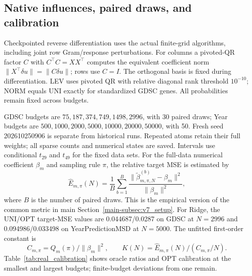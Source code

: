 \documentclass[11pt,a4paper,leqno]{article}
\numberwithin{equation}{section}
\numberwithin{figure}{section}
\numberwithin{table}{section}
\theoremstyle{plain}
\theoremstyle{definition}
\theoremstyle{remark}
\begin{document}
\subsection{Native influences, paired draws, and calibration}
Checkpointed reverse differentiation uses the actual finite-grid algorithms,
including joint row Gram/response perturbations. For columns a pivoted-QR
factor $C$ with $C^\top C=XX^\top$ computes the equivalent coefficient
norm $\|X^\top\delta u\|=\|C\delta u\|$; rows use $C=I$.
The orthogonal basis is fixed during differentiation. LEV uses pivoted
QR with relative diagonal rank threshold $10^{-10}$; NORM equals UNI
exactly for standardized GDSC genes. All probabilities remain fixed across budgets.

GDSC budgets are $75,187,374,749,1498,2996$, with 30 paired draws;
Year budgets are $500,1000,2000,5000,10000,20000,50000$, with 50.
Fresh seed 202610250906 is separate from historical runs. Repeated atoms
retain their full weights; all sparse counts and numerical states are saved.
Intervals use conditional $t_{29}$ and $t_{49}$ for the fixed data sets.
For the full-data numerical coefficient $\beta_m$ and sampling rule $\pi$,
the relative target MSE is estimated by
\begin{equation}\label{eq:real_relative_mse}
 \widehat E_{m,\pi}(N)=\frac1B\sum_{b=1}^B
 \frac{\|\widetilde\beta_{m,\pi,N}^{(b)}-\beta_m\|^2}{\|\beta_m\|^2},
\end{equation}
where $B$ is the number of paired draws. This is the empirical version of
the common metric in main Section~\ref{main-subsec:v7_setup}.
For Ridge, the UNI/OPT target-MSE values are 0.044687/0.0287 on GDSC
at $N=2996$ and 0.094986/0.033498 on YearPredictionMSD at $N=5000$.
The unfitted first-order constant is
\[
 C_{m,\pi}=Q_m(\pi)/\|\beta_m\|^2,\qquad
 K(N)=\widehat E_{m,\pi}(N)/(C_{m,\pi}/N).
\]
Table~\ref{tab:real_calibration} shows oracle ratios and OPT calibration
at the smallest and largest budgets; finite-budget deviations from one remain.
\end{document}
